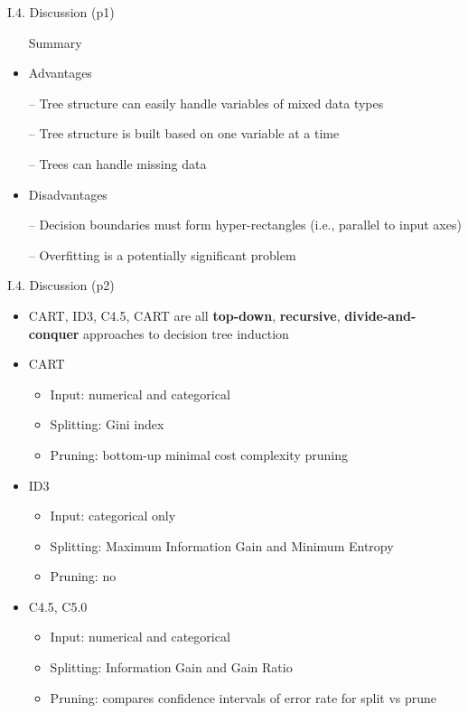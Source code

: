 \documentclass[handout]{beamer}
\newcommand{\strong}[1]{\textbf{\color{teal} #1}}
\begin{document}
\begin{frame}{I.4. Discussion (p1)}
\begin{itemize}
\item[] Summary
\item[]
\item Advantages
\item[--] Tree structure can easily handle variables of mixed data types
\item[--] Tree structure is built based on one variable at a time
\item[--] Trees can handle missing data
\item[]
\item Disadvantages
\item[--] Decision boundaries must form hyper-rectangles (i.e., parallel to input axes)
\item[--] Overfitting is a potentially significant problem
\end{itemize}
\end{frame}
\begin{frame}{I.4. Discussion (p2)}
\begin{itemize}
\item CART, ID3, C4.5, CART are all \strong{top-down}, \strong{recursive}, \strong{divide-and-conquer} approaches to decision tree induction
\item CART 
	\begin{itemize}
	\item Input: numerical and categorical
	\item Splitting: Gini index %
	\item Pruning: bottom-up minimal cost complexity pruning
	\end{itemize}
\item ID3 
	\begin{itemize}
	\item Input: categorical only
	\item Splitting: Maximum Information Gain and Minimum Entropy
	\item Pruning: no
	\end{itemize}
\item C4.5, C5.0
	\begin{itemize}
	\item Input: numerical and categorical
	\item Splitting: Information Gain and Gain Ratio
	\item Pruning: compares confidence intervals of error rate for split vs prune
	\end{itemize}
\end{itemize}
\end{frame}
\end{document}
